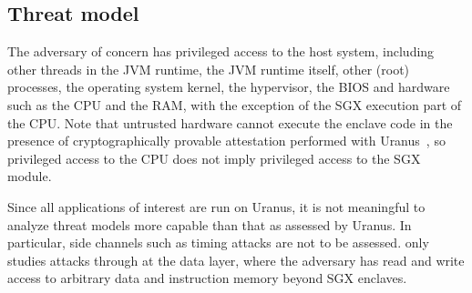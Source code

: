 \subsection{Threat model}\label{subsec:threat-model}
The adversary of concern has privileged access to the host system,
including other threads in the \ac{JVM} runtime, the \ac{JVM} runtime itself,
other (root) processes, the operating system kernel,
the hypervisor, the BIOS and hardware such as the CPU and the RAM,
with the exception of the \ac{SGX} execution part of the CPU\@.
Note that untrusted hardware cannot execute the enclave code
in the presence of cryptographically provable attestation performed with Uranus~\cite{uranus},
so privileged access to the CPU does not imply privileged access to the \ac{SGX} module.

Since all applications of interest are run on Uranus,
it is not meaningful to analyze threat models more capable than that as assessed by Uranus.
In particular, side channels such as timing attacks are not to be assessed.
\pname{} only studies attacks through at the data layer,
where the adversary has read and write access
to arbitrary data and instruction memory beyond \ac{SGX} enclaves.
